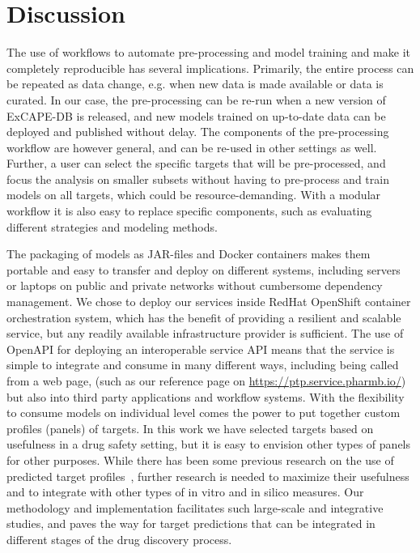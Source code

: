 \documentclass[utf8]{frontiersSCNS} %
\begin{document}
\section{Discussion} \label{Discussion}
The use of workflows to automate pre-processing and model training and make it
completely reproducible has several implications. Primarily, the entire process
can be repeated as data change, e.g. when new data is made available or data is
curated. In our case, the pre-processing can be re-run when a new version of
ExCAPE-DB is released, and new models trained on up-to-date data can be
deployed and published without delay. The components of the pre-processing
workflow are however general, and can be re-used in other settings as well.
Further, a user can select the specific targets that will be pre-processed, and
focus the analysis on smaller subsets without having to pre-process and train
models on all targets, which could be resource-demanding. With a modular
workflow it is also easy to replace specific components, such as evaluating
different strategies and modeling methods.

The packaging of models as JAR-files and Docker containers makes them portable and easy to
transfer and deploy on different systems, including servers or laptops on
public and private networks without cumbersome dependency management. We chose
to deploy our services inside RedHat OpenShift container orchestration system,
which has the benefit of providing a resilient and scalable service, but any
readily available infrastructure provider is sufficient. The use of OpenAPI for
deploying an interoperable service API means that the service is simple to
integrate and consume in many different ways, including being called from a web
page, (such as our reference page on \url{https://ptp.service.pharmb.io/})
but also into third party applications and workflow systems. With the
flexibility to consume models on individual level comes the power to put
together custom profiles (panels) of targets. In this work we have selected
targets based on usefulness in a drug safety setting, but it is easy to
envision other types of panels for other purposes. While there has been some
previous research on the use of predicted target
profiles~\cite{Awale:2017is,Yao:2016ij}, further research is needed to maximize
their usefulness and to integrate with other types of in vitro and in silico
measures. Our methodology and implementation facilitates such large-scale and
integrative studies, and paves the way for target predictions that can be
integrated in different stages of the drug discovery process.
\end{document}
